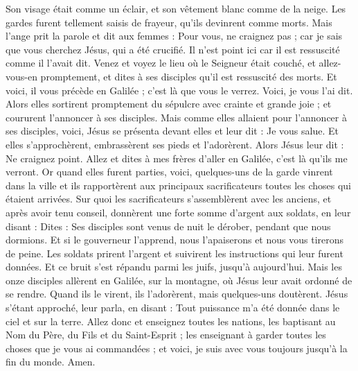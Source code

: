 \begin{multicols}{2}
Son visage était comme un éclair, et son vêtement blanc comme de la neige.
Les gardes furent tellement saisis de frayeur, qu'ils devinrent comme morts.
Mais l'ange prit la parole et dit aux femmes : Pour vous, ne craignez pas ; car je sais que vous cherchez Jésus, qui a été crucifié.
Il n'est point ici car il est ressuscité comme il l'avait dit. Venez et voyez le lieu où le Seigneur était couché,
et allez-vous-en promptement, et dites à ses disciples qu'il est ressuscité des morts. Et voici, il vous précède en Galilée ; c'est là que vous le verrez. Voici, je vous l'ai dit.
Alors elles sortirent promptement du sépulcre avec crainte et grande joie ; et coururent l'annoncer à ses disciples.
Mais comme elles allaient pour l'annoncer à ses disciples, voici, Jésus se présenta devant elles et leur dit : Je vous salue. Et elles s'approchèrent, embrassèrent ses pieds et l'adorèrent.
Alors Jésus leur dit : Ne craignez point. Allez et dites à mes frères d'aller en Galilée, c'est là qu'ils me verront.
 Or quand elles furent parties, voici, quelques-uns de la garde vinrent dans la ville et ils rapportèrent aux principaux sacrificateurs toutes les choses qui étaient arrivées.
Sur quoi les sacrificateurs s'assemblèrent avec les anciens, et après avoir tenu conseil, donnèrent une forte somme d'argent aux soldats,
en leur disant : Dites : Ses disciples sont venus de nuit le dérober, pendant que nous dormions.
Et si le gouverneur l'apprend, nous l'apaiserons et nous vous tirerons de peine.
Les soldats prirent l'argent et suivirent les instructions qui leur furent données. Et ce bruit s'est répandu parmi les juifs, jusqu'à aujourd'hui.
Mais les onze disciples allèrent en Galilée, sur la montagne, où Jésus leur avait ordonné de se rendre.
Quand ils le virent, ils l'adorèrent, mais quelques-uns doutèrent.
Jésus s'étant approché, leur parla, en disant : Tout puissance m'a été donnée dans le ciel et sur la terre.
Allez donc et enseignez toutes les nations, les baptisant au Nom du Père, du Fils et du Saint-Esprit ;
les enseignant à garder toutes les choses que je vous ai commandées ; et voici, je suis avec vous toujours jusqu'à la fin du monde. Amen.
\PPE{}
\end{multicols}
